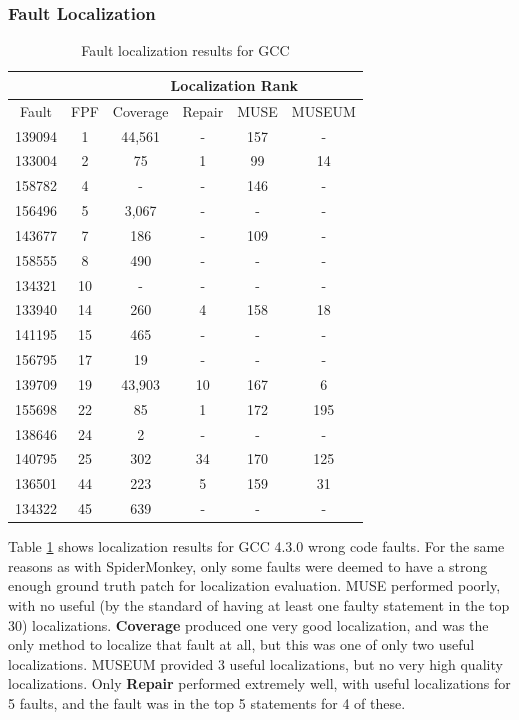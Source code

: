 \subsubsection{Fault Localization}

\begin{table}
\centering
{\scriptsize
\begin{tabular}{|c||c||c|c|c|c|}
\hline
& & \multicolumn{4}{|c|}{Localization Rank} \\
\hline
Fault & FPF & Coverage & Repair & MUSE & MUSEUM \\
\hline
139094 & 1 & 44,561 & - & 157 & -\\
133004 & 2 & 75 & 1 & 99 & 14\\
158782 & 4 & - & - & 146 & -\\
156496 & 5 & 3,067 & - & - & -\\
143677 & 7 & 186 & - & 109 & -\\
158555 & 8 & 490 & - & - & -\\
134321 & 10 & - & - & - & -\\
133940 & 14 & 260 & 4 & 158 & 18\\
141195 & 15 & 465 & - & - & -\\
156795 & 17 & 19 & - & - & -\\
139709 & 19 & 43,903 & 10 & 167 & 6\\
155698 & 22 & 85 & 1 & 172 & 195\\
138646 & 24 & 2 & - & - & -\\
140795 & 25 & 302 & 34 & 170 & 125\\
136501 & 44 & 223 & 5 & 159 & 31\\
134322 & 45 & 639 & - & - & -\\
\hline
\end{tabular}
}
\caption{Fault localization results for GCC}
\label{gcctable}
\end{table}

Table \ref{gcctable} shows localization results for GCC 4.3.0 wrong code faults.  For the same reasons as with SpiderMonkey, only some faults were deemed to have a strong enough ground truth patch for localization evaluation.   MUSE performed poorly, with no useful (by the standard of having at least one faulty statement in the top 30) localizations.  {\bf Coverage} produced one very good localization, and was the only method to localize that fault at all, but this was one of only two useful localizations.  MUSEUM provided 3 useful localizations, but no very high quality localizations.  Only {\bf Repair} performed extremely well, with useful localizations for 5 faults, and the fault was in the top 5 statements for 4 of these.

